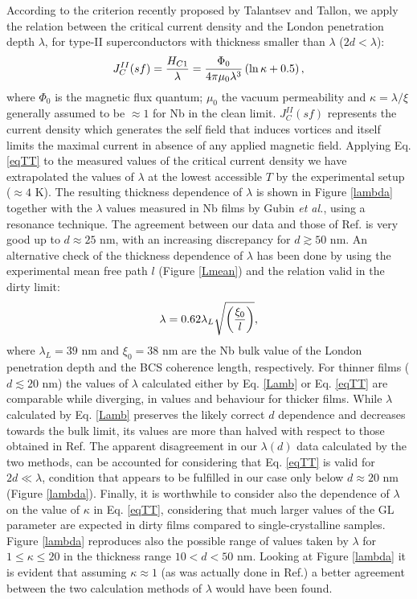 \documentclass[reprint,onecolumn,superscriptaddress,a4paper,nofootinbib,floatfix]{revtex4-1}
\begin{document}
According to the criterion recently proposed by Talantsev and Tallon\cite{Talantsev2015}, we apply the relation between the critical current density and the London penetration depth $\lambda$, for type-II superconductors with thickness smaller than $\lambda$ ($2d<\lambda$):
\begin{equation}
\centering
J^{II}_C(sf) = \frac{H_{C1}}{\lambda}=\frac{\Phi_0}{4\pi\mu_0\lambda^3}\left(\ln\kappa + 0.5\right),
\label{eqTT}
\end{equation}
where $\Phi_0$ is the magnetic flux quantum; $\mu_0$ the vacuum permeability and $\kappa = \lambda / \xi$ generally assumed to be $\approx 1$ for Nb in the clean limit. $J^{II}_C(sf)$ represents the current density which generates the self field that induces vortices and itself limits the maximal current in absence of any applied magnetic field.
Applying Eq. \eqref{eqTT} to the measured values of the critical current density we have extrapolated the values of $\lambda$ at the lowest accessible $T$ by the experimental setup ($\approx 4$ K). The resulting thickness dependence of $\lambda$ is shown in Figure \ref{lambda} together with the $\lambda$ values measured in Nb films by Gubin \textit{et al.}, using a resonance technique.\cite{Gubin2005} The agreement between our data and those of Ref. \cite{Gubin2005} is very good up to $d \approx 25$ nm, with an increasing discrepancy for $d \gtrsim 50$ nm. 
An alternative check of the thickness dependence of $\lambda$ has been done by using the experimental mean free path $l$ (Figure \ref{Lmean}) and the relation valid in the dirty limit:\cite{deGennes}
\begin{equation}
\centering
\lambda = 0.62\lambda_L\sqrt{\left(\frac{\xi_0}{l}\right)},
\label{Lamb}
\end{equation}
where $\lambda_L = 39$ nm and $\xi_0 = 38$ nm are the Nb bulk value of the London penetration depth and the BCS coherence length, respectively. For thinner films ($d \lesssim 20$ nm) the values of $\lambda$ calculated either by Eq. \eqref{Lamb} or Eq. \eqref{eqTT} are comparable while diverging, in values and behaviour for thicker films. 
While $\lambda$ calculated by Eq. \eqref{Lamb} preserves the likely correct $d$ dependence and decreases towards the bulk limit, its values are more than halved with respect to those obtained in Ref. \cite{Gubin2005} The apparent disagreement in our $\lambda(d)$ data calculated by the two methods, can be accounted for considering that Eq. \eqref{eqTT} is valid for $2d \ll \lambda$,\cite{Talantsev2015} condition that appears to be fulfilled in our case only below $d \approx 20$ nm (Figure \ref{lambda}). Finally, it is worthwhile to consider also the dependence of $\lambda$ on the value of $\kappa$ in Eq. \eqref{eqTT}, considering that much larger values of the GL parameter are expected in dirty films compared to single-crystalline samples.
Figure \ref{lambda} reproduces also the possible range of values taken by $\lambda$ for $1 \leq \kappa \leq 20$ in the thickness range $10 < d < 50$ nm. Looking at Figure \ref{lambda} it is evident that assuming $\kappa \approx 1$ (as was actually done in Ref.\cite{Talantsev2015}) a better agreement between the two calculation methods of $\lambda$ would have been found.
\end{document}
